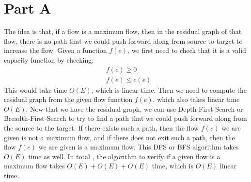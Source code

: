\documentclass[11pt]{article}
\begin{document}

\section{Part A}
\noindent The idea is that, if a flow is a maximum flow, then in the residual graph of that flow, there is no path that we could push forward along from source to target to increase the flow.\newline
\noindent Given a function $f(e)$, we first need to check that it is a valid capacity function by checking:
\begin{align*}
& f(e) \geq 0 \\
& f(e)\leq c(e)
\end{align*}
This would take time $O(E)$, which is linear time. \newline
\noindent Then we need to compute the residual graph from the given flow function $f(e)$, which also takes linear time $O(E)$.  Now that we have the residual graph, we can use Depth-First Search or Breadth-First-Search to try to find a path that we could push forward along from the source to the target. If there exists such a path, then the flow $f(e)$ we are given is not a maximum flow, and if there does not exit such a path, then the flow $f(e)$ we are given is a maximum flow. This DFS or BFS algorithm takes $O(E)$ time as well.\newline
\noindent In total , the algorithm to verify if a given flow is a maximum flow takes $O(E)+O(E)+O(E)$ time, which is $O(E)$ linear time. 
\end{document}
